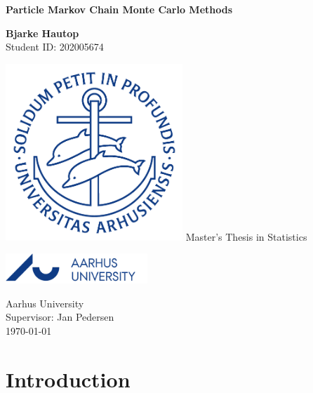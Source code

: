 \documentclass[12pt,a4paper,oneside]{memoir}
\theoremstyle{definition}
\begin{document}
	
	\begin{center}
		\vspace*{1cm}
		
		\Huge 
		\textbf{Particle Markov Chain Monte Carlo  Methods}
		
		\vspace{1.5cm}
		
		\textbf{Bjarke Hautop}\\[0.5cm]
		\Large
		Student ID: 202005674
		
		\vspace{1.6cm}
		\includegraphics[width=0.5\textwidth]{segl.png}
		\vfill
		\Huge
		Master's Thesis in Statistics
		
		\vspace{0.8cm}
		
		\includegraphics[width=0.4\textwidth]{logo.png}
		
		\Large
		Aarhus University\\
		Supervisor: Jan Pedersen\\
		\today
		
	\end{center}
	\newpage
	
	\begin{abstract}
		\lipsum[1]
	\end{abstract}
	\newpage
	
	\tableofcontents
	
	\chapter{Introduction}
	
	
\end{document}
